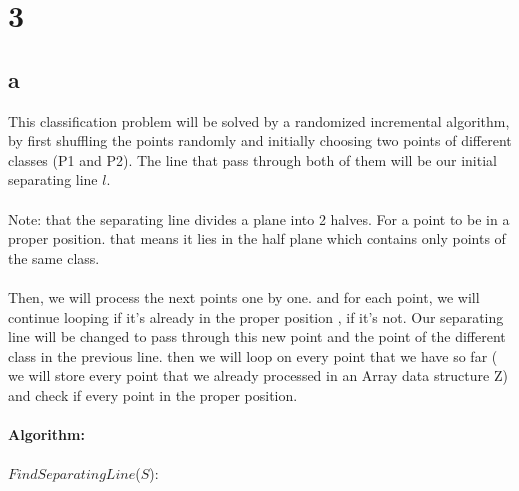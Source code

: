 
\section*{3}
\subsection*{a}

This classification problem will be solved by a randomized incremental algorithm, by first shuffling the points randomly and initially choosing two points of different classes (P1 and P2). The line that pass through both  of them will be our initial separating line $l$. \\
\\
Note: that the separating line divides a plane into 2 halves. For a point to be in a proper position. that means it lies in the half plane which contains only points of the same class. \\
\\
Then, we will process the next points one by one. and for each point, we will continue looping if it's already in the proper position , if it's not. Our separating line will be changed to pass through this new point and the point of the different class in the previous line. then we will loop on every point that we have so far ( we will store every point that we already processed in an Array data structure Z) and check if every point in the proper position. 
\\
\\
\textbf{Algorithm:}\\
\\
$FindSeparatingLine$($S$):
